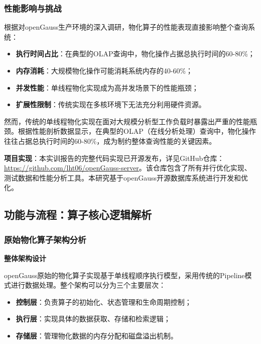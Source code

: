 \subsubsection{性能影响与挑战}

根据对openGauss生产环境的深入调研，物化算子的性能表现直接影响整个查询系统：

\begin{itemize}
    \item \textbf{执行时间占比}：在典型的OLAP查询中，物化操作占据总执行时间的60-80\%；
    \item \textbf{内存消耗}：大规模物化操作可能消耗系统内存的40-60\%；
    \item \textbf{并发性能}：单线程物化实现成为高并发场景下的性能瓶颈；
    \item \textbf{扩展性限制}：传统实现在多核环境下无法充分利用硬件资源。
\end{itemize}

然而，传统的单线程物化实现在面对大规模分析型工作负载时暴露出严重的性能瓶颈。根据性能剖析数据显示，在典型的OLAP（在线分析处理）查询中，物化操作往往占据总执行时间的60-80\%，成为制约整体查询性能的关键因素。

\textbf{项目实现}：本实训报告的完整代码实现已开源发布，详见GitHub仓库：\url{https://github.com/lht06/openGauss-server}。该仓库包含了所有并行优化实现、测试数据和性能分析工具。本研究基于openGauss开源数据库系统\cite{opengauss2024github}进行开发和优化。

\subsection{功能与流程：算子核心逻辑解析}

\subsubsection{原始物化算子架构分析}

\textbf{整体架构设计}

openGauss原始的物化算子实现基于单线程顺序执行模型，采用传统的Pipeline模式进行数据处理\cite{parallel2021materialization}。整个架构可以分为三个主要层次：

\begin{itemize}
    \item \textbf{控制层}：负责算子的初始化、状态管理和生命周期控制；
    \item \textbf{执行层}：实现具体的数据获取、存储和检索逻辑；
    \item \textbf{存储层}：管理物化数据的内存分配和磁盘溢出机制。
\end{itemize}

